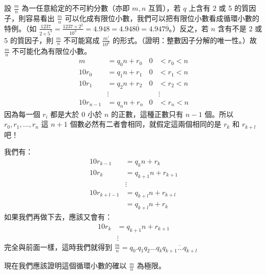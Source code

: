 設 $\frac{m}{n}$ 為一任意給定的不可約分數（亦即 $m, n$ 互質），若 $q$ 上含有 2 或 5 的質因子\label{note:b2-ch2-p56-q-typo}，則容易看出 $\frac{m}{n}$ 可以化成有限位小數，我們可以把有限位小數看成循環小數的特例。（如 $\frac{1237}{2\times 5^3} = \frac{1237\times 2^2}{10^3} = 4.948 = 4.948\overline{0} = 4.947\overline{9}$。）反之，若 $n$ 含有不是 2 或 5 的質因子，則 $\frac{m}{n}$ 不可能寫成 $\frac{m'}{10^k}$ 的形式。（證明：整數因子分解的唯一性。）故 $\frac{m}{n}$ 不可能化為有限位小數。
\begin{align*}
m &= q_0 n + r_0 & 0 &< r_0 < n \\
10r_0 &= q_1 n + r_1 & 0 &< r_1 < n \\
10r_1 &= q_2 n + r_2 & 0 &< r_2 < n \\
&\vdots & &\vdots \\
10r_{n-1} &= q_n n + r_n & 0 &< r_n < n
\end{align*}
因為每一個 $r_i$ 都是大於 0 小於 $n$ 的正數，這種正數只有 $n-1$ 個。所以 $r_0, r_1, \dots, r_n$ 這 $n+1$ 個數必然有二者會相同，就假定這兩個相同的是 $r_k$ 和 $r_{k+l}$ 吧！

我們有：
\begin{align*}
10r_{k-1} &= q_k n + r_k \\
10r_k &= q_{k+1} n + r_{k+1} \\
&\vdots \\
10r_{k+l-1} &= q_{k+l} n + r_{k+l} \\
&= q_{k+l} n + r_k
\end{align*}
如果我們再做下去，應該又會有：
\begin{align*}
10r_k &= q_{k+1} n + r_{k+1} \\
&\vdots
\end{align*}
完全與前面一樣，這時我們就得到 $\frac{m}{n} = q_0.q_1 q_2 \dots q_k \overline{q_{k+1}\dots q_{k+l}}$

現在我們應該證明這個循環小數的確以 $\frac{m}{n}$ 為極限。

